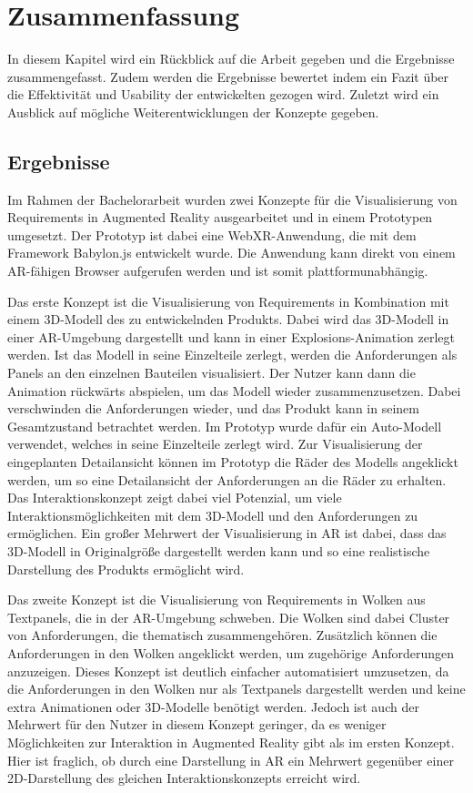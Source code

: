 \chapter{Zusammenfassung}

In diesem Kapitel wird ein Rückblick auf die Arbeit gegeben und die Ergebnisse zusammengefasst.
Zudem werden die Ergebnisse bewertet indem ein Fazit über die Effektivität und Usability der entwickelten gezogen wird.
Zuletzt wird ein Ausblick auf mögliche Weiterentwicklungen der Konzepte gegeben.

\section{Ergebnisse}

Im Rahmen der Bachelorarbeit wurden zwei Konzepte für die Visualisierung von Requirements in Augmented Reality ausgearbeitet und in einem Prototypen umgesetzt.
Der Prototyp ist dabei eine WebXR-Anwendung, die mit dem Framework Babylon.js entwickelt wurde.
Die Anwendung kann direkt von einem AR-fähigen Browser aufgerufen werden und ist somit plattformunabhängig.

Das erste Konzept ist die Visualisierung von Requirements in Kombination mit einem 3D-Modell des zu entwickelnden Produkts.
Dabei wird das 3D-Modell in einer AR-Umgebung dargestellt und kann in einer \glqq{}Explosions\grqq{}-Animation zerlegt werden.
Ist das Modell in seine Einzelteile zerlegt, werden die Anforderungen als Panels an den einzelnen Bauteilen visualisiert.
Der Nutzer kann dann die Animation rückwärts abspielen, um das Modell wieder zusammenzusetzen.
Dabei verschwinden die Anforderungen wieder, und das Produkt kann in seinem Gesamtzustand betrachtet werden.
Im Prototyp wurde dafür ein Auto-Modell verwendet, welches in seine Einzelteile zerlegt wird.
Zur Visualisierung der eingeplanten Detailansicht können im Prototyp die Räder des Modells angeklickt werden, um so eine Detailansicht der Anforderungen an die Räder zu erhalten.
Das Interaktionskonzept zeigt dabei viel Potenzial, um viele Interaktionsmöglichkeiten mit dem 3D-Modell und den Anforderungen zu ermöglichen.
Ein großer Mehrwert der Visualisierung in AR ist dabei, dass das 3D-Modell in Originalgröße dargestellt werden kann und so eine realistische Darstellung des Produkts ermöglicht wird.

Das zweite Konzept ist die Visualisierung von Requirements in Wolken aus Textpanels, die in der AR-Umgebung schweben.
Die Wolken sind dabei Cluster von Anforderungen, die thematisch zusammengehören.
Zusätzlich können die Anforderungen in den Wolken angeklickt werden, um zugehörige Anforderungen anzuzeigen.
Dieses Konzept ist deutlich einfacher automatisiert umzusetzen, da die Anforderungen in den Wolken nur als Textpanels dargestellt werden und keine extra Animationen oder 3D-Modelle benötigt werden.
Jedoch ist auch der Mehrwert für den Nutzer in diesem Konzept geringer, da es weniger Möglichkeiten zur Interaktion in Augmented Reality gibt als im ersten Konzept.
Hier ist fraglich, ob durch eine Darstellung in AR ein Mehrwert gegenüber einer 2D-Darstellung des gleichen Interaktionskonzepts erreicht wird.


